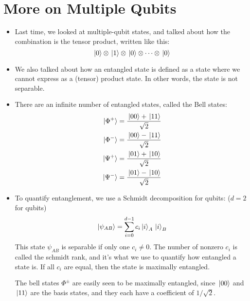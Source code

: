 \section{More on Multiple Qubits}
\begin{itemize}
	\item Last time, we looked at multiple-qubit states, and talked about how the combination is the tensor product, 
		written like this:
		\[
		\ket*{0} \otimes \ket*{1} \otimes \ket*{0} \otimes \cdots \otimes \ket*{0}
		\] 
	\item We also talked about how an entangled state is defined as a state where we cannot express as a (tensor) 
		product state. In other words, the state is not separable. 
	\item There are an infinite number of entangled states, called the Bell states:
		\begin{align*}
			\ket*{\Phi^{+}} &= \frac{\ket*{00} + \ket*{11}}{\sqrt{2} }\\
			\ket*{\Phi^{-}} &= \frac{\ket*{00} - \ket*{11}}{\sqrt{2} } \\
			\ket*{\Psi^{+}} &= \frac{\ket*{01} + \ket*{10}}{\sqrt{2} } \\
			\ket*{\Psi^{-}}&= \frac{\ket*{01} - \ket*{10}}{\sqrt{2} } 
		\end{align*}
	\item To quantify entanglement, we use a Schmidt decomposition for qubits: (\( d = 2 \) for qubits)
		\[
		\ket*{\psi_{AB}} = \sum_{i = 0}^{d - 1} c_i \ket*{i}_A \ket*{i}_B
		\] 
		This state \( \psi_{AB} \) is separable if only one \( c_i \neq 0 \). The number of nonzero \( c_i \) is 
		called the schmidt rank, and it's what we use to quantify how entangled a state is. If all \( c_i \) are equal, 
		then the state is maximally entangled.
		
		The bell states \( \Phi^{\pm} \) are easily seen to be maximally entangled, since \( \ket*{00} \) and 
		\( \ket*{11} \) are the basis states, and they each have a coefficient of \( 1 / \sqrt{2}  \).  
\end{itemize}

